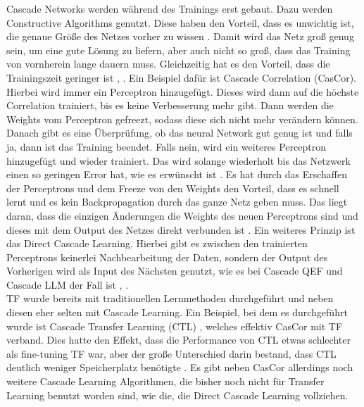 Cascade Networks werden während des Trainings erst gebaut. Dazu werden Constructive 
Algorithms genutzt. Diese haben den Vorteil, dass es unwichtig ist, die genaue Größe 
des Netzes vorher zu wissen \cite{Constructive_Cascade}. Damit wird das Netz groß 
genug sein, um eine gute Lösung zu liefern, aber auch nicht so groß, dass das 
Training von vornherein lange dauern muss. Gleichzeitig hat es den Vorteil, dass 
die Trainingszeit geringer ist \cite{Constructive_Cascade}, \cite{cascor}. 
Ein Beispiel dafür ist Cascade Correlation (CasCor). Hierbei wird immer ein Perceptron hinzugefügt. 
Dieses wird dann auf die höchste Correlation trainiert, bis es keine Verbesserung mehr gibt. 
Dann werden die Weights vom Perceptron gefreezt, sodass diese sich nicht mehr verändern können. 
Danach gibt es eine Überprüfung, ob das neural Network gut genug ist und falls ja, dann 
ist das Training beendet. Falls nein, wird ein weiteres Perceptron hinzugefügt und wieder 
trainiert. Das wird solange wiederholt bis das Netzwerk einen so geringen Error hat, wie 
es erwünscht ist \cite{cascor}. Es hat durch das Erschaffen der Perceptrons und dem 
Freeze von den Weights den Vorteil, dass es schnell lernt und es kein Backpropagation 
durch das ganze Netz geben muss. Das liegt daran, dass die einzigen Änderungen die Weights 
des neuen Perceptrons sind und dieses mit dem Output des Netzes direkt verbunden ist \cite{cascor}. 
Ein weiteres Prinzip ist das Direct Cascade Learning. Hierbei gibt es zwischen den trainierten 
Perceptrons keinerlei Nachbearbeitung der Daten, sondern der Output des Vorherigen wird 
als Input des Nächsten genutzt, wie es bei Cascade QEF und Cascade LLM der Fall ist \cite{cascade_network_architectures}, \cite{cascade_llm_networks}.\\

TF wurde bereits mit traditionellen Lernmethoden durchgeführt und neben diesen 
eher selten mit Cascade Learning. Ein Beispiel, bei dem es durchgeführt wurde ist Cascade Transfer 
Learning (CTL) \cite{phd_deep_cascade}, 
welches effektiv CasCor \cite{cascor} mit TF verband. Dies hatte den Effekt, dass die Performance von CTL 
etwas schlechter als fine-tuning TF war, aber der große Unterschied darin bestand, dass CTL deutlich 
weniger Speicherplatz benötigte \cite{phd_deep_cascade}. 
Es gibt neben CasCor allerdings noch weitere Cascade Learning Algorithmen, die 
bisher noch nicht für Transfer Learning benutzt worden sind, wie die, die Direct Cascade Learning 
vollziehen. 
